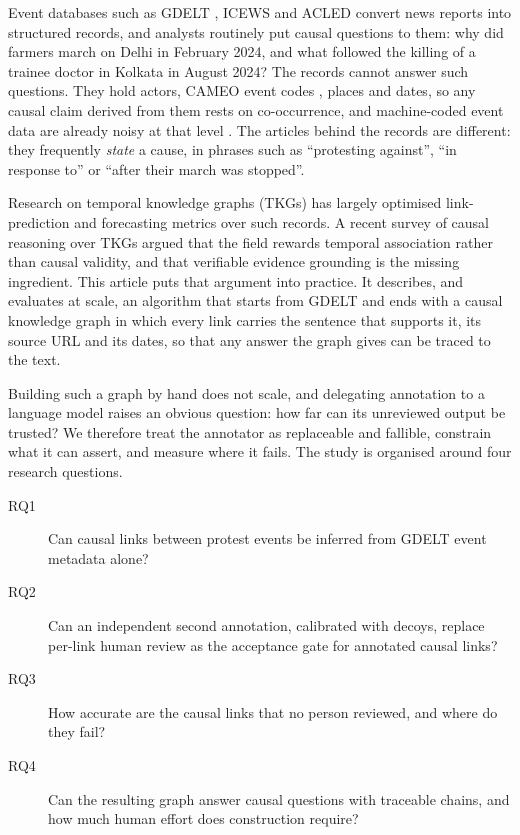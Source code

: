 \documentclass[pdflatex,sn-basic,lineno]{sn-jnl}
\theoremstyle{thmstylethree}
\theoremstyle{thmstyleone}
\begin{document}
Event databases such as GDELT \citep{gdelt}, ICEWS \citep{icews} and ACLED \citep{acled} convert
news reports into structured records, and analysts routinely put causal questions to them: why did
farmers march on Delhi in February 2024, and what followed the killing of a trainee doctor in
Kolkata in August 2024? The records cannot answer such questions. They hold actors, CAMEO event
codes \citep{cameo}, places and dates, so any causal claim derived from them rests on
co-occurrence, and machine-coded event data are already noisy at that level \citep{hammond}. The
articles behind the records are different: they frequently \emph{state} a cause, in phrases such
as ``protesting against'', ``in response to'' or ``after their march was stopped''.

Research on temporal knowledge graphs (TKGs) has largely optimised link-prediction and forecasting
metrics over such records. A recent survey of causal reasoning over TKGs \citep{survey} argued
that the field rewards temporal association rather than causal validity, and that verifiable
evidence grounding is the missing ingredient. This article puts that argument into practice. It
describes, and evaluates at scale, an algorithm that starts from GDELT and ends with a causal
knowledge graph \citep{hogan} in which every link carries the sentence that supports it, its
source URL and its dates, so that any answer the graph gives can be traced to the text.

Building such a graph by hand does not scale, and delegating annotation to a language model raises
an obvious question: how far can its unreviewed output be trusted? We therefore treat the
annotator as replaceable and fallible, constrain what it can assert, and measure where it fails.
The study is organised around four research questions.

\begin{description}
\item[RQ1] Can causal links between protest events be inferred from GDELT event metadata alone?
\item[RQ2] Can an independent second annotation, calibrated with decoys, replace per-link human
review as the acceptance gate for annotated causal links?
\item[RQ3] How accurate are the causal links that no person reviewed, and where do they fail?
\item[RQ4] Can the resulting graph answer causal questions with traceable chains, and how much
human effort does construction require?
\end{description}
\end{document}
